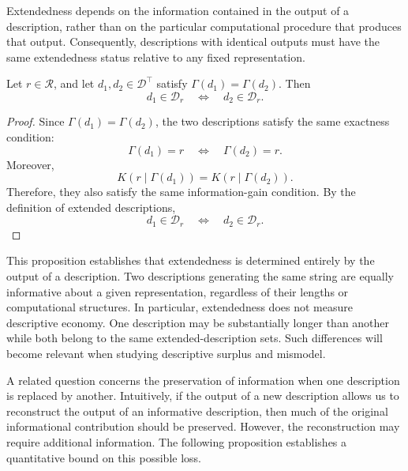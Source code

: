 Extendedness depends on the information contained in the output of a description, rather than on the particular computational procedure that produces that output. Consequently, descriptions with identical outputs must have the same extendedness status relative to any fixed representation.

\begin{proposition}
\label{prop:extended_description_depends_only_on_output}
Let $r\in\mathcal{R}$, and let $d_1,d_2\in\mathcal{D}^\top$ satisfy $\Gamma(d_1)=\Gamma(d_2)$. Then
\[
d_1\in\mathcal{D}_r
\quad\Longleftrightarrow\quad
d_2\in\mathcal{D}_r.
\]
\end{proposition}
\begin{proof}
Since $\Gamma(d_1)=\Gamma(d_2)$, the two descriptions satisfy the same exactness condition:
\[
\Gamma(d_1)=r
\quad\Longleftrightarrow\quad
\Gamma(d_2)=r.
\]
Moreover,
\[
K(r\mid\Gamma(d_1))
=
K(r\mid\Gamma(d_2)).
\]
Therefore, they also satisfy the same information-gain condition. By the definition of extended descriptions,
\[
d_1\in\mathcal{D}_r
\quad\Longleftrightarrow\quad
d_2\in\mathcal{D}_r.
\]
\end{proof}

This proposition establishes that extendedness is determined entirely by the output of a description. Two descriptions generating the same string are equally informative about a given representation, regardless of their lengths or computational structures. In particular, extendedness does not measure descriptive economy. One description may be substantially longer than another while both belong to the same extended-description sets. Such differences will become relevant when studying descriptive surplus and mismodel.

A related question concerns the preservation of information when one description is replaced by another. Intuitively, if the output of a new description allows us to reconstruct the output of an informative description, then much of the original informational contribution should be preserved. However, the reconstruction may require additional information. The following proposition establishes a quantitative bound on this possible loss.

